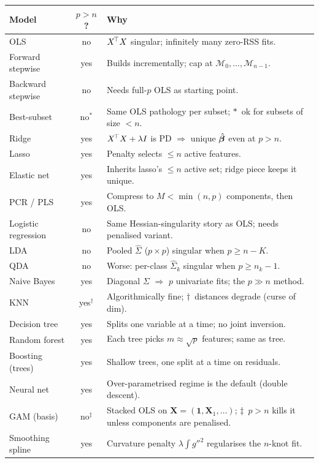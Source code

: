\scriptsize
\begin{tabularx}{\linewidth}{@{}l c X@{}}
\toprule
\textbf{Model} & \textbf{$p>n$?} & \textbf{Why} \\
\midrule
OLS                 & no   & $X^{\!\top} X$ singular; infinitely many zero-RSS fits. \\
Forward stepwise    & yes  & Builds incrementally; cap at $\mathcal{M}_0,\dots,\mathcal{M}_{n-1}$. \\
Backward stepwise   & no   & Needs full-$p$ OLS as starting point. \\
Best-subset         & no$^\ast$ & Same OLS pathology per subset; $\ast$~ok for subsets of size $<n$. \\
Ridge               & yes  & $X^{\!\top} X+\lambda I$ is PD $\Rightarrow$ unique $\hat{\bm{\beta}}$ even at $p>n$. \\
Lasso               & yes  & Penalty selects $\le n$ active features. \\
Elastic net         & yes  & Inherits lasso's $\le n$ active set; ridge piece keeps it unique. \\
PCR / PLS           & yes  & Compress to $M<\min(n,p)$ components, then OLS. \\
Logistic regression & no   & Same Hessian-singularity story as OLS; needs penalised variant. \\
LDA                 & no   & Pooled $\hat\Sigma$ ($p\times p$) singular when $p\ge n-K$. \\
QDA                 & no   & Worse: per-class $\hat\Sigma_k$ singular when $p\ge n_k-1$. \\
Naive Bayes         & yes  & Diagonal $\Sigma$ $\Rightarrow$ $p$ univariate fits; the $p\gg n$ method. \\
KNN                 & yes$^\dagger$ & Algorithmically fine; $\dagger$~distances degrade (curse of dim). \\
Decision tree       & yes  & Splits one variable at a time; no joint inversion. \\
Random forest       & yes  & Each tree picks $m\!\approx\!\sqrt{p}$ features; same as tree. \\
Boosting (trees)    & yes  & Shallow trees, one split at a time on residuals. \\
Neural net          & yes  & Over-parametrised regime is the default (double descent). \\
GAM (basis)         & no$^\ddagger$ & Stacked OLS on $\mathbf X=(\mathbf 1,\mathbf X_1,\dots)$; $\ddagger$~$p>n$ kills it unless components are penalised. \\
Smoothing spline    & yes  & Curvature penalty $\lambda\!\int g''^2$ regularises the $n$-knot fit. \\
\bottomrule
\end{tabularx}

